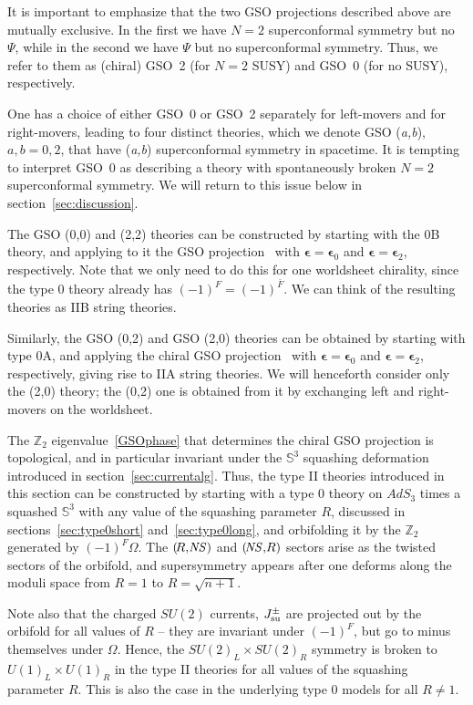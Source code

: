 \documentclass[12pt]{article}
\def\epsilonb{{\boldsymbol\epsilon}}
\def\uone{U(1)}
\def\NS{{\it \!NS}}
\newcommand{\bS}{{\mathbb S}}
\newcommand{\bZ}{{\mathbb Z}}
\numberwithin{equation}{section}
\begin{document}
It is important to emphasize that the two GSO projections described above are mutually exclusive. In the first we have $N=2$ superconformal symmetry but no $\Psi$, while in the second we have $\Psi$ but no superconformal symmetry. Thus, we refer to them as (chiral) GSO~2 (for $N=2$ SUSY) and GSO~0 (for no SUSY), respectively. 

One has a choice of either GSO~0 or GSO~2 separately for left-movers and for right-movers, leading to four distinct theories, which we denote GSO ({\it a,b}), $a,b=0,2$, that have ({\it a,b}) superconformal symmetry in spacetime. It is tempting to interpret GSO~0 as describing a theory with spontaneously broken $N=2$ superconformal symmetry. We will return to this issue below in section~\ref{sec:discussion}. 


The GSO (0,0) and (2,2) theories can be constructed by starting with the 0B theory, and applying to it the GSO projection \chiralGSO\ with $\epsilonb=\epsilonb_0$ and $\epsilonb=\epsilonb_2$, respectively. Note that we only need to do this for one worldsheet chirality, since the type 0 theory already has $(-1)^F=(-1)^{\bar F}$. We can think of the resulting theories as IIB string theories.

Similarly, the GSO (0,2) and GSO (2,0) theories can be obtained by starting with type 0A, and applying the chiral GSO projection \chiralGSO\ with $\epsilonb=\epsilonb_0$ and $\epsilonb=\epsilonb_2$, respectively, giving rise to IIA string theories. We will henceforth consider only the (2,0) theory; the (0,2) one is obtained from it by exchanging left and right-movers on the worldsheet.

The $\bZ_2$ eigenvalue~\eqref{GSOphase} that determines the chiral GSO projection is topological, and in particular invariant under the $\bS^3$ squashing deformation introduced in section~\ref{sec:currentalg}.  Thus, the type II theories introduced in this section can be constructed by starting with a type 0 theory on $AdS_3$ times a squashed $\bS^3$ with any value of the squashing parameter $R$, discussed in sections~\ref{sec:type0short} and~\ref{sec:type0long}, and orbifolding it by the $\bZ_2$ generated by $(-1)^F\Omega$.  The $(\!R,\NS)$ and $(\NS,\!R)$ sectors arise as the twisted sectors of the orbifold, and supersymmetry appears after one deforms along the moduli space from $R=1$ to $R=\sqrt{n+1}$. 

Note also that the charged $SU(2)$ currents, $J^\pm_{\rm su}$ are projected out by the orbifold for all values of $R$ -- they are invariant under $(-1)^F$, but go to minus themselves under $\Omega$.  Hence, the $SU(2)_L\times SU(2)_R$ symmetry is broken to $\uone_L\times\uone_R$ in the type II theories for all values of the squashing parameter $R$. This is also the case in the underlying type 0 models for all $R\not=1$.
\end{document}
